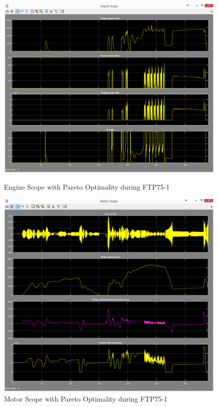 \begin{figure}[hp]
\centering
\includegraphics[scale=0.37]{figures/Pareto/FTP75-1/engine30Juni}
\caption{Engine Scope with Pareto Optimality during FTP75-1}
\label{fig:epo1}

\includegraphics[scale=0.37]{figures/Pareto/FTP75-1/motor30Juni}
\caption{Motor Scope with Pareto Optimality during FTP75-1}
\label{fig:mpo1}
\end{figure}


